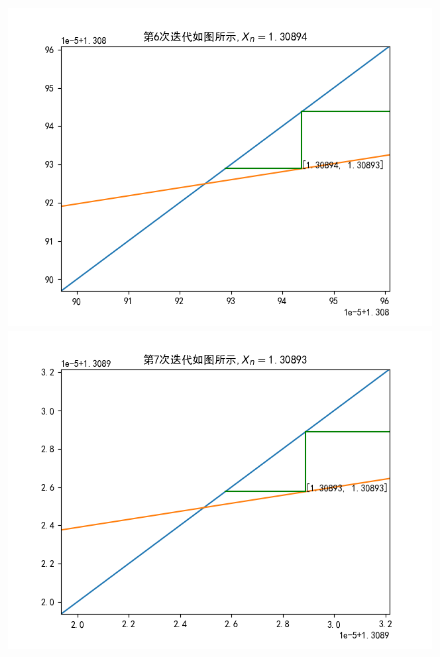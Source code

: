 \documentclass[UTF8]{ctexart}
\begin{document}
\begin{figure}[h]
  \centering
  \begin{minipage}[t]{0.4\linewidth}
  \includegraphics[width=\linewidth]{第6次迭代.png}
  \end{minipage}%
  \begin{minipage}[t]{0.4\linewidth}
  \includegraphics[width=\linewidth]{第7次迭代.png}
  \end{minipage}
\end{figure}
\end{document}
